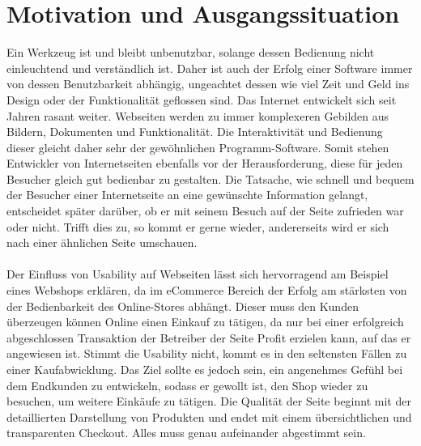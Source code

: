 %
%
%
%

\section{Motivation und Ausgangssituation}

Ein Werkzeug ist und bleibt unbenutzbar, solange dessen Bedienung nicht einleuchtend und verständlich ist. Daher ist auch der Erfolg einer Software immer von dessen Benutzbarkeit abhängig, ungeachtet dessen wie viel Zeit und Geld ins Design oder der Funktionalität geflossen sind. Das Internet entwickelt sich seit Jahren rasant weiter. Webseiten werden zu immer komplexeren Gebilden aus Bildern, Dokumenten und Funktionalität. Die Interaktivität und Bedienung dieser gleicht daher sehr der gewöhnlichen Programm-Software. Somit stehen Entwickler von Internetseiten ebenfalls vor der Herausforderung, diese für jeden Besucher gleich gut bedienbar zu gestalten. Die Tatsache, wie schnell und bequem der Besucher einer Internetseite an eine gewünschte Information gelangt, entscheidet später darüber, ob er mit seinem Besuch auf der Seite zufrieden war oder nicht. Trifft dies zu, so kommt er gerne wieder, andererseits wird er sich nach einer ähnlichen Seite umschauen.\\
\\
Der Einfluss von Usability auf Webseiten lässt sich hervorragend am Beispiel eines Webshops erklären, da im eCommerce Bereich der Erfolg am stärksten von der Bedienbarkeit des Online-Stores abhängt. Dieser muss den Kunden überzeugen können Online einen Einkauf zu tätigen, da nur bei einer erfolgreich abgeschlossen Transaktion der Betreiber der Seite Profit erzielen kann, auf das er angewiesen ist. Stimmt die Usability nicht, kommt es in den seltensten Fällen zu einer Kaufabwicklung. Das Ziel sollte es jedoch sein, ein angenehmes Gefühl bei dem Endkunden zu entwickeln, sodass er gewollt ist, den Shop wieder zu besuchen, um weitere Einkäufe zu tätigen. Die Qualität der Seite beginnt mit der detaillierten Darstellung von Produkten und endet mit einem übersichtlichen und transparenten Checkout. Alles muss genau aufeinander abgestimmt sein.\\
\\
\label{usability-auf-uniseiten}
